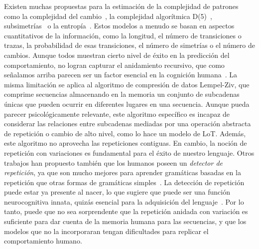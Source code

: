 Existen muchas propuestas para la estimación de la complejidad de patrones como la complejidad del cambio~\cite{f47}, la complejidad algorítmica D(5)~\cite{f44,f45,f46}, subsimetrías~\cite{f94} o la entropía~\cite{f34,f96,f97,f98,f111}. Estos modelos a menudo se basan en aspectos cuantitativos de la información, como la longitud, el número de transiciones o trazas, la probabilidad de esas transiciones, el número de simetrías o el número de cambios. Aunque todos muestran cierto nivel de éxito en la predicción del comportamiento, no logran capturar el anidamiento recursivo, que como señalamos arriba parecen ser un factor esencial en la cognición humana~\cite{f4,f6}. La misma limitación se aplica al algoritmo de compresión de datos Lempel-Ziv, que comprime secuencias almacenando en la memoria un conjunto de subcadenas únicas que pueden ocurrir en diferentes lugares en una secuencia. Aunque pueda parecer psicológicamente relevante, este algoritmo específico es incapaz de considerar las relaciones entre subcadenas mediadas por una operación abstracta de repetición o cambio de alto nivel, como lo hace un modelo de LoT. Además, este algoritmo no aprovecha las repeticiones contiguas. En cambio, la noción de repetición con variaciones es fundamental para el éxito de nuestro lenguaje. Otros trabajos han propuesto también que los humanos poseen un \textit{detector de repetición}, ya que son mucho mejores para aprender gramáticas basadas en la repetición que otras formas de gramáticas simples~\cite{f113}. La detección de repetición puede estar ya presente al nacer, lo que sugiere que puede ser una función neurocognitiva innata, quizás esencial para la adquisición del lenguaje~\cite{f114}. Por lo tanto, puede que no sea sorprendente que la repetición anidada con variación es suficiente para dar cuenta de la memoria humana para las secuencias, y que los modelos que no la incorporaran tengan dificultades para replicar el comportamiento humano.


